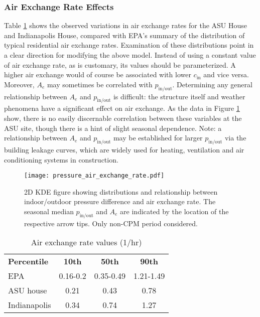 \documentclass[preprint,12pt]{elsarticle}
\begin{document}
\subsubsection{Air Exchange Rate Effects}\label{s:results_model_air_exchange}

Table \ref{tbl:air_exchange_rate} shows the observed variations in air exchange rates for the ASU House and Indianapolis House, compared with EPA’s summary of the distribution of typical residential air exchange rates\cite{u.s._epa_exposure_2011,m._d._koontz_estimation_1995}.
Examination of these distributions point in a clear direction for modifying the above model.
Instead of using a constant value of air exchange rate, as is customary, its values should be parameterized.
A higher air exchange would of course be associated with lower $c_\mathrm{in}$ and vice versa.
Moreover, $A_e$ may sometimes be correlated with $p_\mathrm{in/out}$.
Determining any general relationship between $A_e$ and $p_\mathrm{in/out}$ is difficult: the structure itself and weather phenomena have a significant effect on air exchange.
As the data in Figure \ref{fig:air_exchange_rate} show, there is no easily discernable correlation between these variables at the ASU site, though there is a hint of slight seasonal dependence.
Note: a relationship between $A_e$ and $p_\mathrm{in/out}$ may be established for larger $p_\mathrm{in/out}$ via the building leakage curves, which are widely used for heating, ventilation and air conditioning systems in construction.\par

\begin{figure}[htb!]
  \texttt{[image: pressure\_air\_exchange\_rate.pdf]}
  \caption{2D KDE figure showing distributions and relationship between indoor/outdoor pressure difference and air exchange rate. The seasonal median $p_\mathrm{in/out}$ and $A_e$ are indicated by the location of the respective arrow tips. Only non-CPM period considered.}\label{fig:air_exchange_rate}
\end{figure}

\begin{table}[htb!]
  \centering
  \begin{tabular}{l c c c}
    \toprule
    \textbf{Percentile}                                                     & \textbf{10th} & \textbf{50th} & \textbf{90th} \\
    EPA\cite{u.s._epa_exposure_2011,m._d._koontz_estimation_1995}           & 0.16-0.2      & 0.35-0.49     & 1.21-1.49     \\
    ASU house\cite{holton_temporal_2013,guo_identification_2015}            & 0.21          & 0.43          & 0.78          \\
    Indianapolis\cite{u.s._environmental_protection_agency_assessment_2015} & 0.34          & 0.74          & 1.27          \\
    \bottomrule
  \end{tabular}
  \caption{Air exchange rate values (1/hr)}\label{tbl:air_exchange_rate}
\end{table}
\end{document}
